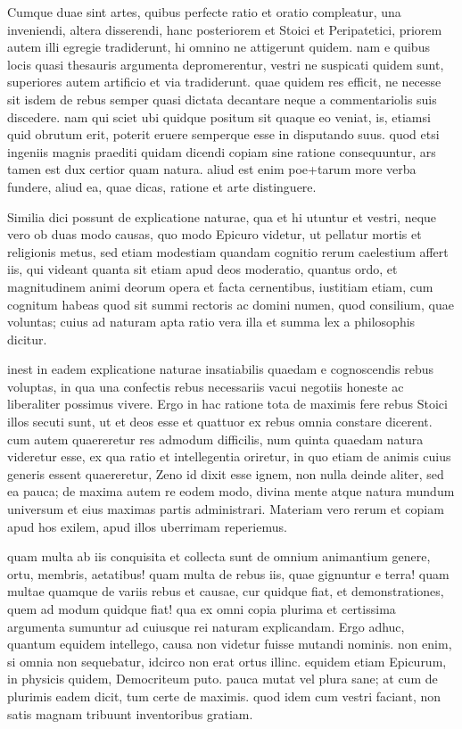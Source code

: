  Cumque duae sint artes, quibus perfecte ratio et oratio compleatur, una inveniendi, altera disserendi, hanc posteriorem et Stoici et Peripatetici, priorem autem illi egregie tradiderunt, hi omnino ne attigerunt quidem. nam e quibus locis quasi thesauris argumenta depromerentur, vestri ne suspicati quidem sunt, superiores autem artificio et via tradiderunt. quae quidem res efficit, ne necesse sit isdem de rebus semper quasi dictata decantare neque a commentariolis suis discedere. nam qui sciet ubi quidque positum sit quaque eo veniat, is, etiamsi quid obrutum erit, poterit eruere semperque esse in disputando suus. quod etsi ingeniis magnis praediti quidam dicendi copiam sine ratione consequuntur, ars tamen est dux certior quam natura. aliud est enim poe+tarum more verba fundere, aliud ea, quae dicas, ratione et arte distinguere.

 Similia dici possunt de explicatione naturae, qua et hi utuntur et vestri, neque vero ob duas modo causas, quo modo Epicuro videtur, ut pellatur mortis et religionis metus, sed etiam modestiam quandam cognitio rerum caelestium affert iis, qui videant quanta sit etiam apud deos moderatio, quantus ordo, et magnitudinem animi deorum opera et facta cernentibus, iustitiam etiam, cum cognitum habeas quod sit summi rectoris ac domini numen, quod consilium, quae voluntas; cuius ad naturam apta ratio vera illa et summa lex a philosophis dicitur.

 inest in eadem explicatione naturae insatiabilis quaedam e cognoscendis rebus voluptas, in qua una confectis rebus necessariis vacui negotiis honeste ac liberaliter possimus vivere. Ergo in hac ratione tota de maximis fere rebus Stoici illos secuti sunt, ut et deos esse et quattuor ex rebus omnia constare dicerent. cum autem quaereretur res admodum difficilis, num quinta quaedam natura videretur esse, ex qua ratio et intellegentia oriretur, in quo etiam de animis cuius generis essent quaereretur, Zeno id dixit esse ignem, non nulla deinde aliter, sed ea pauca; de maxima autem re eodem modo, divina mente atque natura mundum universum et eius maximas partis administrari. Materiam vero rerum et copiam apud hos exilem, apud illos uberrimam reperiemus.

 quam multa ab iis conquisita et collecta sunt de omnium animantium genere, ortu, membris, aetatibus! quam multa de rebus iis, quae gignuntur e terra! quam multae quamque de variis rebus et causae, cur quidque fiat, et demonstrationes, quem ad modum quidque fiat! qua ex omni copia plurima et certissima argumenta sumuntur ad cuiusque rei naturam explicandam. Ergo adhuc, quantum equidem intellego, causa non videtur fuisse mutandi nominis. non enim, si omnia non sequebatur, idcirco non erat ortus illinc. equidem etiam Epicurum, in physicis quidem, Democriteum puto. pauca mutat vel plura sane; at cum de plurimis eadem dicit, tum certe de maximis. quod idem cum vestri faciant, non satis magnam tribuunt inventoribus gratiam.

